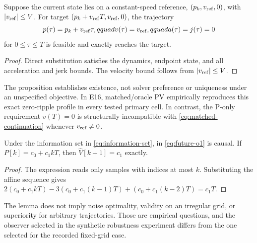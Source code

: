 \begin{proposition}
\label{prop:matched-pv}
Suppose the current state lies on a constant-speed reference, $(p_k,v_{\mathrm{ref}},0)$, with $\lvert v_{\mathrm{ref}}\rvert\le V$. For target $(p_k+v_{\mathrm{ref}} T,v_{\mathrm{ref}},0)$, the trajectory
\begin{equation}
 p(\tau)=p_k+v_{\mathrm{ref}}\tau,qquad
 v(\tau)=v_{\mathrm{ref}},qquad a(\tau)=j(\tau)=0
 \label{eq:matched-continuation}
\end{equation}
for $0\le\tau\le T$ is feasible and exactly reaches the target.
\end{proposition}

\begin{proof}
Direct substitution satisfies the dynamics, endpoint state, and all acceleration and jerk bounds. The velocity bound follows from $\lvert v_{\mathrm{ref}}\rvert\le V$.
\end{proof}

The proposition establishes existence, not solver preference or uniqueness under an unspecified objective. In E16, matched/oracle PV empirically reproduces this exact zero-ripple profile in every tested primary cell. In contrast, the P-only requirement $v(T)=0$ is structurally incompatible with \cref{eq:matched-continuation} whenever $v_{\mathrm{ref}}\ne0$.

\begin{lemma}
\label{lem:future-o1}
Under the information set in \cref{eq:information-set}, \FutureOOne{} in \cref{eq:future-o1} is causal. If $P[k]=c_0+c_1kT$, then $\widehat V[k+1]=c_1$ exactly.
\end{lemma}

\begin{proof}
The expression reads only samples with indices at most $k$. Substituting the affine sequence gives
$2(c_0+c_1kT)-3(c_0+c_1(k-1)T)+(c_0+c_1(k-2)T)=c_1T$.
\end{proof}

The lemma does not imply noise optimality, validity on an irregular grid, or superiority for arbitrary trajectories. Those are empirical questions, and the observer selected in the synthetic robustness experiment differs from the one selected for the recorded fixed-grid case.

